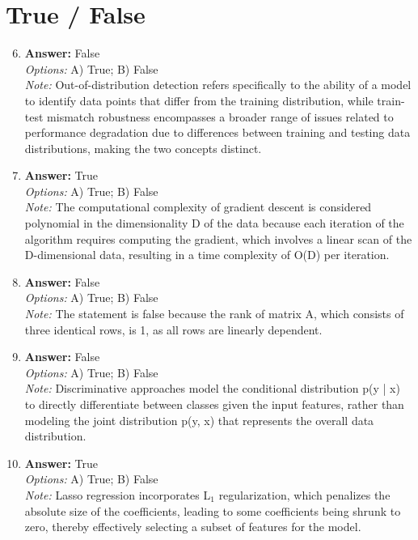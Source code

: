 \documentclass[12pt]{article}
\begin{document}
\section*{True / False}
\begin{enumerate}[label=\arabic*.]
\setcounter{enumi}{5}
\item \textbf{Answer:} False
\\ \textit{Options:} A) True; B) False
\\ \textit{Note:} Out-of-distribution detection refers specifically to the ability of a model to identify data points that differ from the training distribution, while train-test mismatch robustness encompasses a broader range of issues related to performance degradation due to differences between training and testing data distributions, making the two concepts distinct.
\item \textbf{Answer:} True
\\ \textit{Options:} A) True; B) False
\\ \textit{Note:} The computational complexity of gradient descent is considered polynomial in the dimensionality D of the data because each iteration of the algorithm requires computing the gradient, which involves a linear scan of the D-dimensional data, resulting in a time complexity of O(D) per iteration.
\item \textbf{Answer:} False
\\ \textit{Options:} A) True; B) False
\\ \textit{Note:} The statement is false because the rank of matrix A, which consists of three identical rows, is 1, as all rows are linearly dependent.
\item \textbf{Answer:} False
\\ \textit{Options:} A) True; B) False
\\ \textit{Note:} Discriminative approaches model the conditional distribution p(y | x) to directly differentiate between classes given the input features, rather than modeling the joint distribution p(y, x) that represents the overall data distribution.
\item \textbf{Answer:} True
\\ \textit{Options:} A) True; B) False
\\ \textit{Note:} Lasso regression incorporates L$_{1}$ regularization, which penalizes the absolute size of the coefficients, leading to some coefficients being shrunk to zero, thereby effectively selecting a subset of features for the model.
\end{enumerate}
\end{document}
